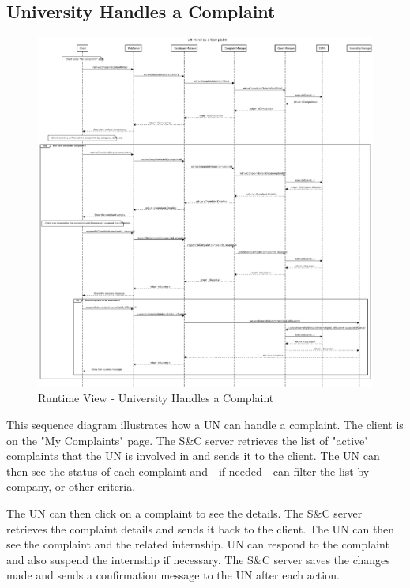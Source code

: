 
\subsection{University Handles a Complaint}
\label{sub:university-handles-a-complaint}%

\begin{figure}[H]
      \centering
      \includegraphics[width=1.0\textwidth]{Images/RV_13.pdf}
      \caption{Runtime View - University Handles a Complaint}
      \label{fig:rv-un-handles-complaint}
\end{figure}

\par This sequence diagram illustrates how a UN can handle a complaint. The client is on the "My Complaints" page. The
S\&C server retrieves the list of "active" complaints that the UN is involved in and sends it to the client. The UN can
then see the status of each complaint and - if needed - can filter the list by company, or other criteria.

\par The UN can then click on a complaint to see the details. The S\&C server retrieves the complaint details and sends
it back to the client. The UN can then see the complaint and the related internship. UN can respond to the complaint
and also suspend the internship if necessary. The S\&C server saves the changes made and sends a confirmation message
to the UN after each action.

